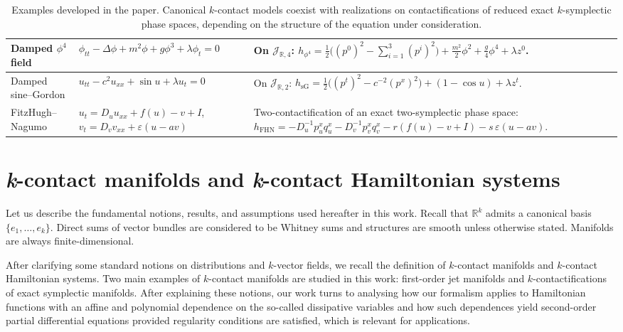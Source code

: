 \documentclass[11pt,a4paper]{article}
\theoremstyle{plain} \newtheorem{theorem}{Theorem}[section] \newtheorem{proposition}[theorem]{Proposition} \newtheorem{corollary}[theorem]{Corollary} \newtheorem{lemma}[theorem]{Lemma} \theoremstyle{definition} \newtheorem{definition}[theorem]{Definition} \theoremstyle{remark} \newtheorem{remark}[theorem]{Remark} \newtheorem{example}[theorem]{Example} %
\begin{document}
\begin{table}[ht]
\begin{tabularx}{\textwidth}{|p{2.7cm}|Y|Y|}
\hline
Damped \(\phi^4\) field & \(\phi_{tt}-\Delta\phi+m^2\phi+g\phi^3+\lambda\phi_t=0\) & On \(\mathcal J_{\mathbb R,4}\): \(h_{\phi^4}=\frac12\bigl((p^0)^2-\sum_{i=1}^3(p^i)^2\bigr)+\frac{m^2}{2}\phi^2+\frac{g}{4}\phi^4+\lambda z^0\). \\
\hline
Damped sine--Gordon & \(u_{tt}-c^2u_{xx}+\sin u+\lambda u_t=0\) & On \(\mathcal J_{\mathbb R,2}\): \(h_{\mathrm{sG}}=\frac12\bigl((p^t)^2-c^{-2}(p^x)^2\bigr)+(1-\cos u)+\lambda z^t\). \\
\hline
FitzHugh--Nagumo & \(u_t=D_u u_{xx}+f(u)-v+I\), \(v_t=D_v v_{xx}+\varepsilon(u-a v)\) & Two-contactification of an exact two-symplectic phase space: \(h_{\mathrm{FHN}}=-D_u^{-1}p_u^xq_u^x-D_v^{-1}p_v^xq_v^x-r(f(u)-v+I)-s\,\varepsilon(u-a v)\). \\
\hline
\end{tabularx}
\caption{Examples developed in the paper. Canonical \(k\)-contact models coexist with realizations on contactifications of reduced exact \(k\)-symplectic phase spaces, depending on the structure of the equation under consideration.}
\label{tab:kcontact_examples}
\end{table}
\section{{\it k}-contact manifolds and {\it k}-contact Hamiltonian systems}
\label{sec:2}

Let us describe the fundamental notions, results, and assumptions used hereafter in this work. Recall that $\mathbb{R}^k$ admits a canonical basis $\{e_1,\ldots,e_k\}$. Direct sums of vector bundles are considered to be Whitney sums and structures are smooth unless otherwise stated.  Manifolds are always finite-dimensional.  

After clarifying some standard notions on distributions and $k$-vector fields, we recall the definition of $k$-contact manifolds and $k$-contact Hamiltonian systems. Two main examples of $k$-contact manifolds are studied in this work: first-order jet manifolds and $k$-contactifications of exact symplectic manifolds. 
After explaining these notions, our work turns to  analysing how our formalism applies to Hamiltonian functions with an affine and polynomial dependence on the so-called dissipative variables and how such dependences yield second-order partial differential equations provided regularity conditions are satisfied, which is relevant for applications.
\end{document}
